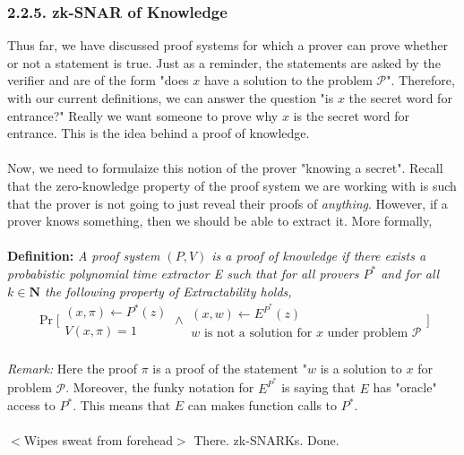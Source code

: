 \documentclass{article}
\newcommand{\N}{{\mathbf N}}
\begin{document}
\subsubsection*{2.2.5. zk-SNAR of Knowledge}
Thus far, we have discussed proof systems for which a prover can prove whether or not a statement is true. Just as a reminder, the statements are asked by the verifier and are of the form "does $x$ have a solution to the problem $\mathcal{P}$". Therefore, with our current definitions, we can answer the question "is $x$ the secret word for entrance?" Really we want someone to prove why $x$ is the secret word for entrance. This is the idea behind a proof of knowledge. \\ \\
\noindent Now, we need to formulaize this notion of the prover "knowing a secret". Recall that the zero-knowledge property of the proof system we are working with is such that the prover is not going to just reveal their proofs of \textit{anything}. However, if a prover knows something, then we should be able to extract it. More formally, \\ \\
\noindent \textbf{Definition: } \textit{A proof system $(P, V)$ is a proof of knowledge if there exists a probabistic polynomial time extractor E such that for all provers $P^*$ and for all $k \in \N$ the following property of Extractability holds,}
$$\Pr\bigg[\begin{array}{c} (x, \pi) \leftarrow P^*(z) \\ V(x, \pi) = 1\end{array} \wedge \begin{array}{c} (x, w) \leftarrow E^{P^*}(z) \\ w \text{ is not a solution for } x \text{ under problem } \mathcal{P}\end{array}\bigg]$$
\\
\noindent \textit{Remark: } Here the proof $\pi$ is a proof of the statement "$w$ is a solution to $x$ for problem $\mathcal{P}$. Moreover, the funky notation for $E^{P^*}$ is saying that $E$ has "oracle" access to $P^*$. This means that $E$ can makes function calls to $P^*$.\\ \\
\noindent $<$Wipes sweat from forehead$>$ There. zk-SNARKs. Done.
\end{document}
